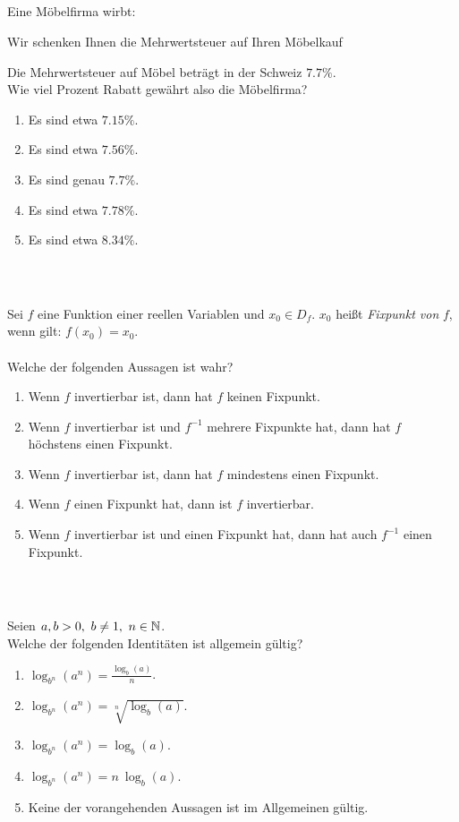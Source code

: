 \subsection*{}
Eine Möbelfirma wirbt:
\begin{center}
	\glqq Wir schenken Ihnen die Mehrwertsteuer auf Ihren Möbelkauf\grqq
\end{center}
Die Mehrwertsteuer auf Möbel beträgt in der Schweiz $ 7.7 \% $.\\
Wie viel Prozent Rabatt gewährt also die Möbelfirma?
\renewcommand{\labelenumi}{(\alph{enumi})}
\begin{enumerate}
\item 
Es sind etwa $ 7.15 \% $.
\item 
Es sind etwa $ 7.56 \% $.
\item 
Es sind genau $ 7.7 \% $.
\item
Es sind etwa $ 7.78 \% $.
\item
Es sind etwa $ 8.34 \% $.
\end{enumerate}
\ \\
\subsection*{}
Sei $ f $ eine Funktion einer reellen Variablen und $ x_0 \in D_f $.
$ x_0  $ heißt \textit{Fixpunkt von} $ f $, wenn gilt: $ f(x_0) = x_0 $.\\
\\
Welche der folgenden Aussagen ist wahr? 
\renewcommand{\labelenumi}{(\alph{enumi})}
\begin{enumerate}
	\item 
	Wenn $ f $ invertierbar ist, dann hat $ f $ keinen Fixpunkt.
	\item
	Wenn $ f $ invertierbar ist und $ f^{-1} $ mehrere Fixpunkte hat, dann hat $ f $ höchstens einen Fixpunkt.
	\item
	Wenn $ f $ invertierbar ist, dann hat $ f $ mindestens einen Fixpunkt.
	\item
	Wenn $ f  $ einen Fixpunkt hat, dann ist $ f $ invertierbar.
	\item
	Wenn $ f $ invertierbar ist und einen Fixpunkt hat, dann hat auch $ f^{-1} $ einen Fixpunkt.
\end{enumerate}
\ \\
\subsection*{}
Seien $ a,b >0, \ b \neq 1 , \ n \in \mathbb{N}  $.\\
Welche der folgenden Identitäten ist allgemein gültig?
\renewcommand{\labelenumi}{(\alph{enumi})}
\begin{enumerate}
	\item 
	$ \log_{b^n}(a^n) = \frac{\log_{b}(a)}{n} $.
	\item 
	$ \log_{b^n}(a^n) = \sqrt[n]{\log_{b}(a)} $.
	\item
	$ \log_{b^n}(a^n) = \log_{b}(a) $.
	\item
	$ \log_{b^n}(a^n) = n \ \log_{b}(a) $.
	\item
	Keine der vorangehenden Aussagen ist im Allgemeinen gültig.
\end{enumerate}
\ \\
